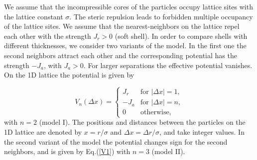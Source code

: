\documentclass[preprint,
prl,%
aps]{revtex4}
\begin{document}
We assume that the incompressible cores of the particles occupy lattice sites with the lattice constant $\sigma$.
The steric repulsion leads to forbidden multiple occupancy of the lattice sites.
We assume that the nearest-neighbors on the lattice repel 
each other with the strength $J_r>0$ (soft shell). In order to compare shells with different thicknesses,
we consider two variants of the model. In the first one the second neighbors attract each other
and the corresponding potential has the strength $-J_a$, with $J_a>0$.
For larger separations the effective potential vanishes. 
On the 1D lattice the  potential is given by 

\begin{equation}
\label{V1}
V_n(\Delta{ x}) = \left\{ \begin{array}{ll}
J_r & \textrm{for $|\Delta{ x}| = 1$},\\
-J_a & \textrm{for $|\Delta{ x}| = n$},\\
0 & \textrm{otherwise,}
\end{array} \right.
\end{equation}
with $n=2$ (model I). 
The positions and distances between the particles on the 1D lattice are 
denoted by $x=r/\sigma$ and  $\Delta x=\Delta r/\sigma$,
and take integer values. 
In the second variant of the model  the  potential changes sign for the second neighbors,
and is given by Eq.(\ref{V1}) with $n=3$ (model II).
\end{document}
